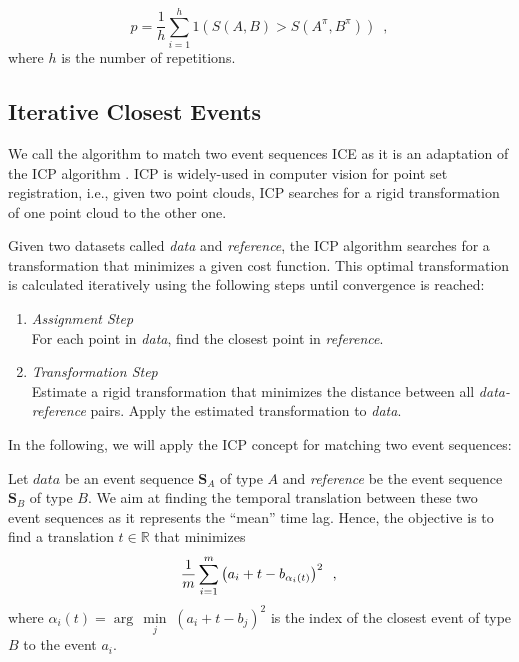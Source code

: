\documentclass[conference]{IEEEtran}
\theoremstyle{examplestyle}
\begin{document}
\begin{equation}
	p = \dfrac{1}{h} \sum_{i = 1}^h 1 \left( S(A, B) > S(A^\pi , B^\pi) \right) \enspace, 
\end{equation}
where \(h\) is the number of repetitions.



\subsection{Iterative Closest Events}
\label{sec:ice}

We call the algorithm to match two event sequences \acf{ICE} as it is an adaptation of the \acf{ICP} algorithm \cite{Besl1992}. \ac{ICP} is widely-used in computer vision for point set registration, i.e., given two point clouds, \ac{ICP} searches for a rigid transformation of one point cloud to the other one. 

Given two datasets called \textit{data} and \textit{reference}, the \ac{ICP} algorithm searches for a transformation that minimizes a given cost function. This optimal transformation is calculated iteratively using the following steps \cite{Besl1992} until convergence is reached:

\begin{enumerate}
	\item \emph{Assignment Step}\\ 
	For each point in \textit{data}, find the closest point in \textit{reference}.
	\item \emph{Transformation Step}\\ Estimate a rigid transformation that minimizes the distance between all \textit{data-reference} pairs. Apply the estimated transformation to \textit{data}.
\end{enumerate}


In the following, we will apply the \ac{ICP} concept for matching two event sequences:

Let \(data\) be an event sequence \(\pmb{S}_A\) of type \(A\) and \emph{reference} be the event sequence \(\pmb{S}_B\) of type \(B\). 
We aim at finding the temporal translation between these two event sequences as it represents the ``mean'' time lag.
Hence, the objective is to find a translation $t \in \mathbb{R}$ that minimizes 
\begin{equation}
 \dfrac{1}{m} \sum_{i = 1}^{m} \left( a_i + t - b_{\alpha_i(t)} \right)^2 \enspace , \\
\end{equation}
where $\alpha_i(t)= \arg\,\min\limits_j \; (a_i+t-b_j)^2$ is the index of the closest event of type $B$ to the event $a_i$.
\end{document}
